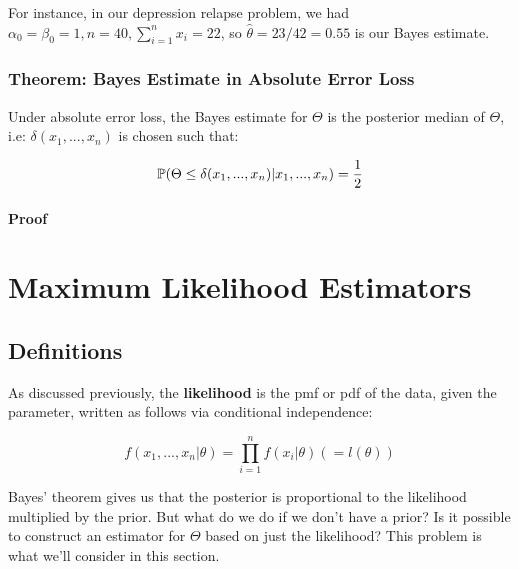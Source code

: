\documentclass[a4paper]{article}
\begin{document}
                For instance, in our depression relapse problem, we had
                $\alpha_0 = \beta_0 = 1, n = 40, \sum\limits_{i=1}^n x_i = 22$,
                so $\widehat \theta = 23/42 = 0.55$ is our Bayes estimate.

            \subsubsection{Theorem: Bayes Estimate in Absolute Error Loss}
                Under absolute error loss, the Bayes estimate for $\Theta$ is
                the posterior median of $\Theta$, i.e: $\delta(x_1, ..., x_n)$
                is chosen such that:

                \[
                    \mathbb{P}(\Theta \leq \delta(x_1, ..., x_n) | x_1, ..., x_n) =
                    \frac{1}{2}
                \]

                \paragraph{Proof}
                    \begin{fread}
                        [DS12, theorem 4.5.3]
                    \end{fread}

    \newpage
    \section{Maximum Likelihood Estimators}
        \subsection{Definitions}
        As discussed previously, the \textbf{likelihood} is the pmf or pdf of
        the data, given the parameter, written as follows via conditional
        independence:

        \[
            f(x_1, ..., x_n | \theta) = \prod_{i=1}^n f(x_i | \theta)
            (=l(\theta))
        \]

        Bayes' theorem gives us that the posterior is proportional to the
        likelihood multiplied by the prior. But what do we do if we don't have a
        prior? Is it possible to construct an estimator for $\Theta$ based on
        just the likelihood? This problem is what we'll consider in this
        section.
\end{document}
